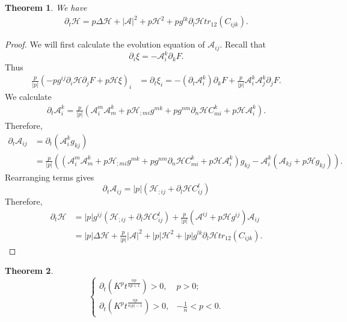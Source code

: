 \documentclass{amsart}
\newtheorem{theorem}{Theorem}
\theoremstyle{definition}
\theoremstyle{remark}
\numberwithin{equation}{section}
\begin{document}
\begin{theorem} We have
\begin{align*}
\partial_t\mathcal{H}= p \Delta \mathcal{H}+|\mathcal{A}|^2+ p  \mathcal{H}^2+ p  g^{lk}\partial_l\mathcal{H} tr_{12}( C _{ijk}).
\end{align*}
\end{theorem}
\begin{proof}
We will first calculate the evolution equation of $\mathcal{A}_{ij}.$ Recall that $$\partial_i\xi=-\mathcal{A}_i^k\partial_kF.$$ Thus
\begin{align*}
\frac{p}{|p|}\left(- p  g^{ij}\partial_i\mathcal{H}\partial_jF+ p  \mathcal{H}\xi\right)_i&=\partial_t\xi_i=-(\partial_t\mathcal{A}_i^k)\partial_kF+\frac{p}{|p|}\mathcal{A}_i^k\mathcal{A}_j^k\partial_jF.
\end{align*}
We calculate
\begin{align*}
\partial_t\mathcal{A}_i^k=\frac{p}{|p|}(\mathcal{A}_i^m\mathcal{A}_m^k+ p  \mathcal{H}_{;mi}g^{mk}+ p
g^{nm}\partial_n \mathcal{H} C _{mi}^k+ p  \mathcal{H}\mathcal{A}_i^k).
\end{align*}
Therefore,
\begin{align*}
\partial_t\mathcal{A}_{ij}&=\partial_t(\mathcal{A}_i^kg_{kj})\\
&=\frac{p}{|p|}\left(\left(\mathcal{A}_i^m\mathcal{A}_m^k+ p  \mathcal{H}_{;mi}g^{mk}+ p
g^{nm}\partial_n \mathcal{H} C _{mi}^k+ p  \mathcal{H}\mathcal{A}_i^k\right)g_{kj}-\mathcal{A}_i^k
(\mathcal{A}_{kj}+ p  \mathcal{H}g_{kj})\right).
\end{align*}
Rearranging terms gives
\[\partial_t \mathcal{A}_{ij}= |p|  (\mathcal{H}_{;ij}+  \partial_l\mathcal{H}  C _{ij}^l)\]
Therefore,
\begin{align*}
\partial_t\mathcal{H}&=|p|g^{ij}( \mathcal{H}_{;ij}+  \partial_l \mathcal{H} C ^l_{ij})+\frac{p}{|p|}(\mathcal{A}^{ij}+ p  \mathcal{H}g^{ij})\mathcal{A}_{ij}\\
&= |p| \Delta \mathcal{H}+\frac{p}{|p|}|\mathcal{A}|^2+ |p|  \mathcal{H}^2+ |p|  g^{lk}\partial_l\mathcal{H} tr_{12}( C _{ijk}).
\end{align*}
\end{proof}
\begin{theorem}
\[\left\{
  \begin{array}{ll}
    \partial_t \left(K^{ p }t^{\frac{n p }{n p +1}}\right)> 0, & p>0; \\
    \partial_t \left(K^{ p }t^{\frac{n p }{n |p| -1}}\right)>0, & -\frac{1}{n}<p<0.
  \end{array}
\right.
\]
\end{theorem}
\end{document}
